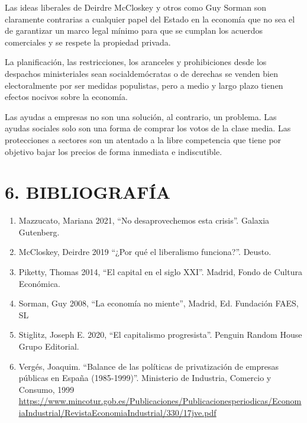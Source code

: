 \documentclass[
]{article}
\begin{document}
Las ideas liberales de Deirdre McCloskey y otros como Guy Sorman son
claramente contrarias a cualquier papel del Estado en la economía que no
sea el de garantizar un marco legal mínimo para que se cumplan los
acuerdos comerciales y se respete la propiedad privada.

La planificación, las restricciones, los aranceles y prohibiciones desde
los despachos ministeriales sean socialdemócratas o de derechas se
venden bien electoralmente por ser medidas populistas, pero a medio y
largo plazo tienen efectos nocivos sobre la economía.

Las ayudas a empresas no son una solución, al contrario, un problema.
Las ayudas sociales solo son una forma de comprar los votos de la clase
media. Las protecciones a sectores son un atentado a la libre
competencia que tiene por objetivo bajar los precios de forma inmediata
e indiscutible.

\hypertarget{bibliografuxeda}{%
\section{6. BIBLIOGRAFÍA}\label{bibliografuxeda}}

\begin{enumerate}
\def\labelenumi{\arabic{enumi}.}
\item
  Mazzucato, Mariana 2021, ``No desaprovechemos esta crisis''. Galaxia
  Gutenberg.
\item
  McCloskey, Deirdre 2019 ``¿Por qué el liberalismo funciona?''. Deusto.
\item
  Piketty, Thomas 2014, ``El capital en el siglo XXI''. Madrid, Fondo de
  Cultura Económica.
\item
  Sorman, Guy 2008, ``La economía no miente'', Madrid, Ed. Fundación
  FAES, SL
\item
  Stiglitz, Joseph E. 2020, ``El capitalismo progresista''. Penguin
  Random House Grupo Editorial.
\item
  Vergés, Joaquim. ``Balance de las políticas de privatización de
  empresas públicas en España (1985-1999)''. Ministerio de Industria,
  Comercio y Consumo, 1999
  \href{https://www.mincotur.gob.es/Publicaciones/Publicacionesperiodicas/EconomiaIndustrial/RevistaEconomiaIndustrial/330/17jve.pdf}{\ul{https://www.mincotur.gob.es/Publicaciones/Publicacionesperiodicas/EconomiaIndustrial/RevistaEconomiaIndustrial/330/17jve.pdf}}
\end{enumerate}
\end{document}
